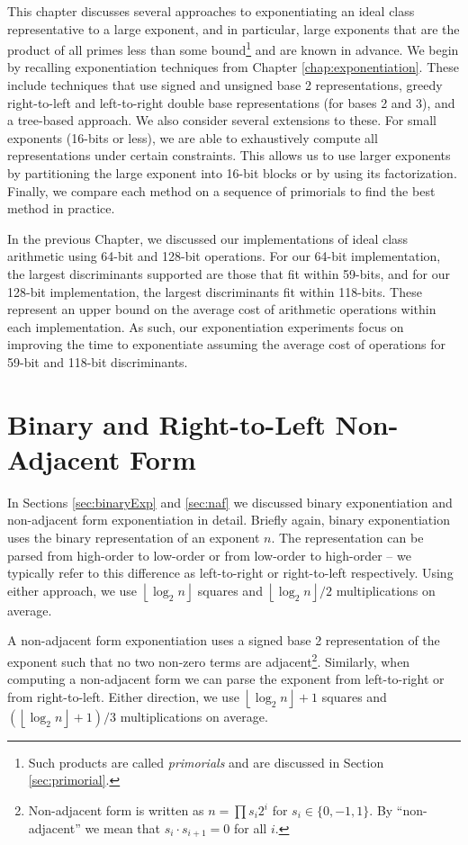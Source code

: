 \documentclass{ucalgthes1}
\theoremstyle{definition}
\newcommand{\floor}[1]{\left\lfloor #1 \right\rfloor}
\begin{document}
This chapter discusses several approaches to exponentiating an ideal class representative to a large exponent, and in particular, large exponents that are the product of all primes less than some bound\footnote{Such products are called \emph{primorials} and are discussed in Section \ref{sec:primorial}.} and are known in advance.  We begin by recalling exponentiation techniques from Chapter \ref{chap:exponentiation}.  These include techniques that use signed and unsigned base 2 representations, greedy right-to-left and left-to-right double base representations (for bases 2 and 3), and a tree-based approach. We also consider several extensions to these.  For small exponents (16-bits or less), we are able to exhaustively compute all representations under certain constraints.  This allows us to use larger exponents by partitioning the large exponent into 16-bit blocks or by using its factorization. Finally, we compare each method on a sequence of primorials to find the best method in practice.

In the previous Chapter, we discussed our implementations of ideal class arithmetic using 64-bit and 128-bit operations.  For our 64-bit implementation, the largest discriminants supported are those that fit within 59-bits, and for our 128-bit implementation, the largest discriminants fit within 118-bits.  These represent an upper bound on the average cost of arithmetic operations within each implementation. As such, our exponentiation experiments focus on improving the time to exponentiate assuming the average cost of operations for 59-bit and 118-bit discriminants.

\section{Binary and Right-to-Left Non-Adjacent Form}

In Sections \ref{sec:binaryExp} and \ref{sec:naf} we discussed binary exponentiation and non-adjacent form exponentiation in detail.  Briefly again, binary exponentiation uses the binary representation of an exponent $n$.  The representation can be parsed from high-order to low-order or from low-order to high-order -- we typically refer to this difference as left-to-right or right-to-left respectively.  Using either approach, we use $\floor{\log_2n}$ squares and $\floor{\log_2n}/2$ multiplications on average.

A non-adjacent form exponentiation uses a signed base 2 representation of the exponent such that no two non-zero terms are adjacent\footnote{Non-adjacent form is written as $n=\prod s_i2^i$ for $s_i \in \{0, -1, 1\}$. By ``non-adjacent'' we mean that $s_i \cdot s_{i+1} = 0$ for all $i$.}.  Similarly, when computing a non-adjacent form we can parse the exponent from left-to-right or from right-to-left.  Either direction, we use $\floor{\log_2n} + 1$ squares and $(\floor{\log_2n}+1)/3$ multiplications on average.   
\end{document}
